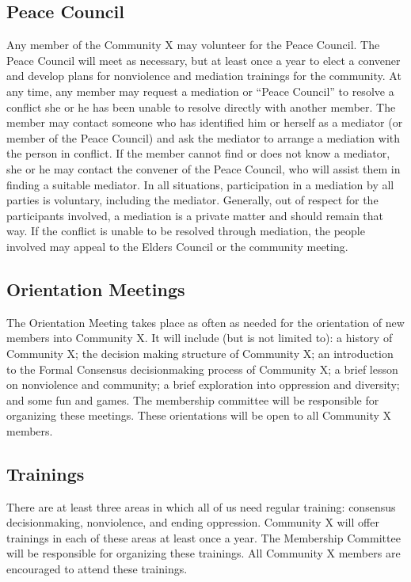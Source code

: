 \subsection*{Peace Council}
Any member of the Community X may volunteer for the Peace Council. The Peace Council will meet as necessary, but at least once a year to elect a convener and develop plans for nonviolence and mediation trainings for the community. At any time, any member may request a mediation or ``Peace Council'' to resolve a conflict she or he has been unable to resolve directly with another member. The member may contact someone who has identified him or herself as a mediator (or member of the Peace Council) and ask the mediator to arrange a mediation with the person in conflict. If the member cannot find or does not know a mediator, she or he may contact the convener of the Peace Council, who will assist them in finding a suitable mediator. In all situations, participation in a mediation by all parties is voluntary, including the mediator. Generally, out of respect for the participants involved, a mediation is a private matter and should remain that way. If the conflict is unable to be resolved through mediation, the people involved may appeal to the Elders Council or the community meeting.


\subsection*{Orientation Meetings}
The Orientation Meeting takes place as often as needed for the orientation of new members into Community X. It will include (but is not limited to): a history of Community X; the decision making structure of Community X; an introduction to the Formal Consensus decisionmaking process of Community X; a brief lesson on nonviolence and community; a brief exploration into oppression and diversity; and some fun and games. The membership committee will be responsible for organizing these meetings. These orientations will be open to all Community X members.


\subsection*{Trainings}
There are at least three areas in which all of us need regular training: consensus decisionmaking, nonviolence, and ending oppression. Community X will offer trainings in each of these areas at least once a year. The Membership Committee will be responsible for organizing these trainings. All Community X members are encouraged to attend these trainings.



